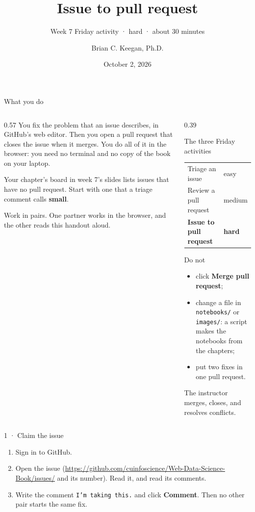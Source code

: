 \documentclass{handout}
\title[INFO 4617 · Week 7 · Friday activities · Issue to pull request]{Issue to pull request}
\subtitle{Week 7 Friday activity · hard · about 30 minutes}
\author{Brian C. Keegan, Ph.D.}
\institute{Department of Information Science, University of Colorado Boulder}
\date{October 2, 2026}
\begin{document}
\maketitle

\begin{frame}{What you do}
  \begin{columns}[T]
    \begin{column}{0.57\textwidth}
      You fix the problem that an issue describes, in GitHub's web editor.
      Then you open a pull request that closes the issue when it merges. You
      do all of it in the browser: you need no terminal and no copy of the
      book on your laptop.

      Your chapter's board in week 7's slides lists issues that have no pull
      request. Start with one that a triage comment calls \textbf{small}.

      Work in pairs. One partner works in the browser, and the other reads
      this handout aloud.
    \end{column}
    \begin{column}{0.39\textwidth}
      \begin{block}{The three Friday activities}
        \small
        \begin{tabular}{@{}ll@{}}
          Triage an issue & easy\\
          Review a pull request & medium\\
          \textbf{Issue to pull request} & \textbf{hard}
        \end{tabular}
      \end{block}
      \begin{alertblock}{Do not}
        \small
        \begin{itemize}
          \item click \textbf{Merge pull request};
          \item change a file in \texttt{notebooks/} or \texttt{images/}: a script makes the notebooks from the chapters;
          \item put two fixes in one pull request.
        \end{itemize}
        The instructor merges, closes, and resolves conflicts.
      \end{alertblock}
    \end{column}
  \end{columns}
\end{frame}

\begin{frame}{1 · Claim the issue}
  \begin{enumerate}
    \item Sign in to GitHub.
    \item Open the issue
      (\url{https://github.com/cuinfoscience/Web-Data-Science-Book/issues/}
      and its number). Read it, and read its comments.
    \item Write the comment \texttt{I'm taking this.} and click
      \textbf{Comment}. Then no other pair starts the same fix.
  \end{enumerate}
\end{frame}
\end{document}
